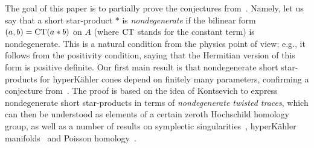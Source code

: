 The goal of this paper is to partially prove the conjectures from~\cite{BPR}.
Namely, let us say that a short star-product $*$ is {\it nondegenerate}
if the bilinear form $(a,b)={\rm CT}(a*b)$ on $A$ (where ${\rm CT}$ stands for the constant term)
 is nondegenerate. This is a natural condition from the physics point of view; e.g.,
it follows from the positivity condition, saying that the Hermitian version of this form is positive definite. Our first main result is that nondegenerate short star-products for hyperK\"ahler cones depend on finitely many parameters, confirming a conjecture from~\cite{BPR}.
The proof is based on the idea of Kontsevich to express nondegenerate short star-products in terms of {\it nondegenerate twisted traces}, which can then be understood as elements of a certain zeroth Hochschild homology group, as well as a number of results on symplectic singularities~\cite{Ka,L2,Na3}, hyperK\"ahler manifolds~\cite{HKLR} and Poisson homology~\cite{ES}.

